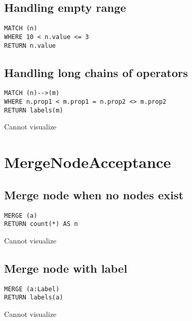 \subsection{Handling empty range}

\begin{lstlisting}
MATCH (n)
WHERE 10 < n.value <= 3
RETURN n.value
\end{lstlisting}

\subsection{Handling long chains of operators}

\begin{lstlisting}
MATCH (n)-->(m)
WHERE n.prop1 < m.prop1 = n.prop2 <> m.prop2
RETURN labels(m)
\end{lstlisting}

Cannot visualize
\section{MergeNodeAcceptance}

\subsection{Merge node when no nodes exist}

\begin{lstlisting}
MERGE (a)
RETURN count(*) AS n
\end{lstlisting}

Cannot visualize
\subsection{Merge node with label}

\begin{lstlisting}
MERGE (a:Label)
RETURN labels(a)
\end{lstlisting}

Cannot visualize
